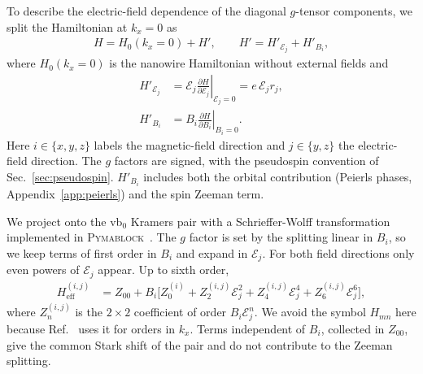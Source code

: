 \documentclass[
  aps,
  reprint,
  amsmath,
  amssymb,
  groupedaddress,
  floatfix,
  longbibliography,
]{revtex4-2}
\begin{document}


To describe the electric-field dependence of the diagonal $g$-tensor components, we split the Hamiltonian at $k_x=0$ as
\begin{align}
H = H_0(k_x=0) + H',
\qquad
H' = H'_{\mathcal E_j}+H'_{B_i},
\end{align}
where $H_0(k_x=0)$ is the nanowire Hamiltonian without external fields and
\begin{align}
H'_{\mathcal E_j}
&=
\mathcal E_j
\left.
\frac{\partial H}{\partial \mathcal E_j}
\right|_{\mathcal E_j=0}
=
e\,\mathcal E_j r_j,
\\
H'_{B_i}
&=
B_i
\left.
\frac{\partial H}{\partial B_i}
\right|_{B_i=0}.
\end{align}
Here $i\in\{x,y,z\}$ labels the magnetic-field direction and $j\in\{y,z\}$ the electric-field direction. The $g$ factors are signed, with the pseudospin convention of Sec.~\ref{sec:pseudospin}. $H'_{B_i}$ includes both the orbital contribution (Peierls phases, Appendix~\ref{app:peierls}) and the spin Zeeman term.

We project onto the vb$_0$ Kramers pair with a Schrieffer-Wolff transformation implemented in \textsc{Pymablock}~\cite{10.21468/SciPostPhysCodeb.50-r2.1}. The $g$ factor is set by the splitting linear in $B_i$, so we keep terms of first order in $B_i$ and expand in $\mathcal E_j$. For both field directions only even powers of $\mathcal E_j$ appear. Up to sixth order,
\begin{align}
H_{\mathrm{eff}}^{(i,j)}
&=
Z_{00}
+B_i\Big[Z_{0}^{(i)}
+Z_{2}^{(i,j)}\mathcal E_j^2
+Z_{4}^{(i,j)}\mathcal E_j^4
+Z_{6}^{(i,j)}\mathcal E_j^6\Big],
\label{eff_ham}
\end{align}
where $Z_n^{(i,j)}$ is the $2\times2$ coefficient of order $B_i\mathcal E_j^n$. We avoid the symbol $H_{mn}$ here because Ref.~\cite{das2026anisotropic} uses it for orders in $k_x$. Terms independent of $B_i$, collected in $Z_{00}$, give the common Stark shift of the pair and do not contribute to the Zeeman splitting.
\end{document}
